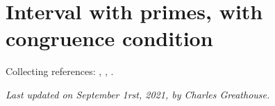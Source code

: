 \par 







\section{Interval with primes, with congruence condition}




Collecting references:
\cite{McCurley*84-2},
\cite{McCurley*84-3},
\cite{Kadiri*05-2}.

























  
\begin{flushright}\small\sl{}   Last updated on September 1rst, 2021, by Charles Greathouse.
 \end{flushright}













